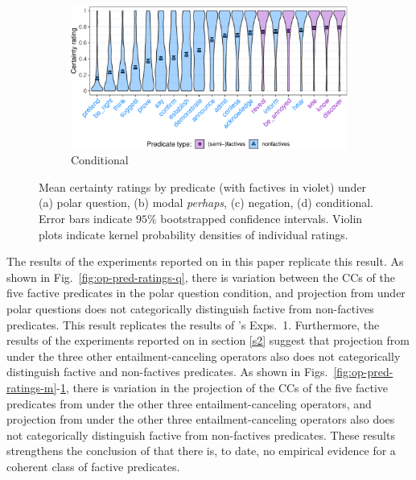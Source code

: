 \documentclass[a4paper,12pt,twoside]{article}
\newcommand{\poscite}[1]{\citeauthor{#1}'s \citeyear{#1}}
\begin{document}
\begin{figure}[h!]
\medskip

\begin{subfigure}[t]{0.57\textwidth}
 \includegraphics[width = 1\linewidth]{conditional-predicate-graph-1.pdf}
\caption{Conditional}\label{fig:op-pred-ratings-c}
\end{subfigure}
\caption{Mean certainty ratings by predicate (with factives in violet) under (a) polar question, (b) modal \emph{perhaps}, (c) negation, (d) conditional. Error bars indicate $95\%$ bootstrapped confidence intervals. Violin plots indicate kernel probability densities of individual ratings.}\label{fig:op-pred-ratings2}
\end{figure}

The results of the experiments reported on in this paper replicate this result. As shown in Fig.~\ref{fig:op-pred-ratings-q}, there is variation between the CCs of the five factive predicates in the polar question condition, and projection from under polar questions does not categorically distinguish factive from non-factives predicates. This result replicates the results of \poscite{degen_are_2022} Exps.~1. Furthermore, the results of the experiments reported on in section \ref{s2} suggest that projection from under the three other entailment-canceling operators also does not categorically distinguish factive and non-factives predicates. As shown in Figs.~\ref{fig:op-pred-ratings-m}-\ref{fig:op-pred-ratings-c}, there is variation in the projection of the CCs of the five factive predicates from under the other three entailment-canceling operators, and projection from under the other three entailment-canceling operators also does not categorically distinguish factive from non-factives predicates. These results strengthens the conclusion of \citealt{degen_are_2022} that there is, to date, no empirical evidence for a coherent class of factive predicates.
\end{document}
